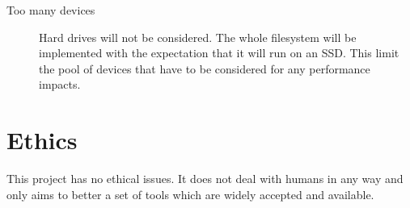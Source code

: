\begin{description}
        \item[Too many devices] Hard drives will not be considered. The whole
            filesystem will be implemented with the expectation that it will
            run on an SSD. This limit the pool of devices that have to be
            considered for any performance impacts.


    \end{description}

%
%
\section{Ethics}

    This project has no ethical issues. It does not deal with humans in any way
    and only aims to better a set of tools which are widely accepted and
    available.
